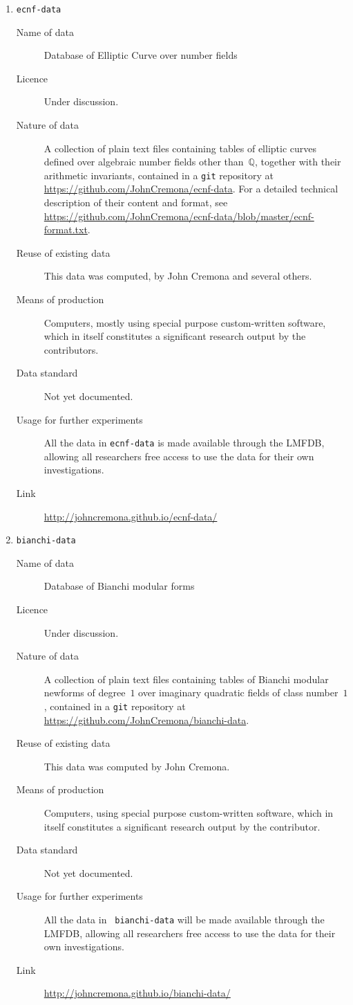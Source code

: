 \documentclass[12pt]{article}
\newcommand{\Q}{\(\mathbb{Q}\)}
\begin{document}
\begin{enumerate}
\item{{\tt ecnf-data}}
\begin{description}
\item[Name of data] Database of Elliptic Curve over number fields
\item[Licence]  Under discussion.
\item[Nature of data] A collection of plain text files containing
  tables of elliptic curves defined over algebraic number fields other
  than~\Q, together with their arithmetic invariants, contained in a
  {\tt git} repository at \url{https://github.com/JohnCremona/ecnf-data}.
  For a detailed technical description of their content and format,
  see \url{https://github.com/JohnCremona/ecnf-data/blob/master/ecnf-format.txt}.
\item[Reuse of existing data] This data was computed, by John Cremona
  and several others.
\item[Means of production] Computers, mostly using special purpose
  custom-written software, which in itself constitutes a significant
  research output by the contributors.
\item[Data standard] Not yet documented.
\item [Usage for further experiments] All the data in {\tt ecnf-data}
  is made available through the LMFDB, allowing all researchers free
  access to use the data for their own investigations.
\item [Link] \url{http://johncremona.github.io/ecnf-data/}
\end{description}

\item{{\tt bianchi-data}}
\begin{description}
\item[Name of data] Database of Bianchi modular forms
\item[Licence]  Under discussion.
\item[Nature of data] A collection of plain text files containing
  tables of Bianchi modular newforms of degree~$1$ over imaginary
  quadratic fields of class number~$1$, contained in a
  {\tt git} repository at \url{https://github.com/JohnCremona/bianchi-data}.
\item[Reuse of existing data] This data was computed by John Cremona.
\item[Means of production] Computers, using special purpose
  custom-written software, which in itself constitutes a significant
  research output by the contributor.
\item[Data standard] Not yet documented.
\item [Usage for further experiments] All the data in {\tt
  bianchi-data} will be made available through the LMFDB, allowing all
  researchers free access to use the data for their own
  investigations.
\item [Link] \url{http://johncremona.github.io/bianchi-data/}
\end{description}


\end{enumerate}
\end{document}
